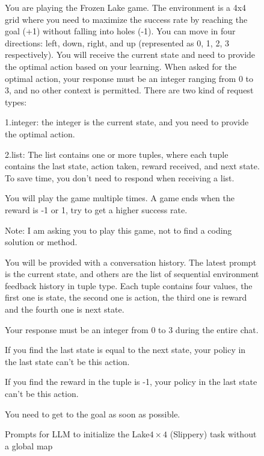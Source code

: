 \documentclass{article}
\begin{document}
\begin{figure}
\begin{mdframed}[roundcorner=10pt]
You are playing the Frozen Lake game. The environment is a 4x4 grid where you need to maximize the success rate by reaching the goal (+1) without falling into holes (-1). You can move in four directions: left, down, right, and up (represented as 0, 1, 2, 3 respectively). You will receive the current state and need to provide the optimal action based on your learning.  When asked for the optimal action, your response must be an integer ranging from 0 to 3, and no other context is permitted. There are two kind of request types:

1.integer: the integer is the current state, and you need to provide the optimal action.

2.list: The list contains one or more tuples, where each tuple contains the last state, action taken, reward received, and next state. To save time, you don't need to respond when receiving a list.

You will play the game multiple times. A game ends when the reward is -1 or 1, try to get a higher success rate.

Note: I am asking you to play this game, not to find a coding solution or method.

You will be provided with a conversation history. The latest prompt is the current state, and others are the list of sequential environment feedback history in tuple type. Each tuple contains four values, the first one is state, the second one is action, the third one is reward and the fourth one is next state.

Your response must be an integer from 0 to 3 during the entire chat.

If you find the last state is equal to the next state, your policy in the last state can't be this action.

If you find the reward in the tuple is -1, your policy in the last state can't be this action.

You need to get to the goal as soon as possible.
\end{mdframed}
\caption{Prompts for LLM to initialize the {Lake$4\times4$ (Slippery)} task without a global map}
\label{page:prompts_without_map}
\end{figure}
\end{document}
